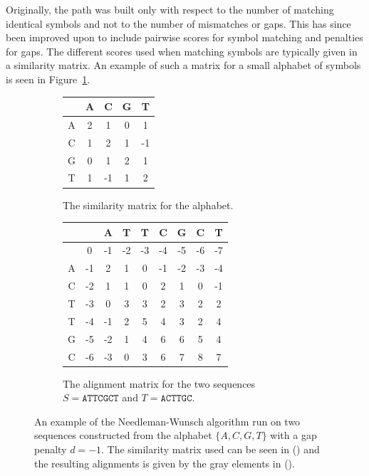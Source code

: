 \documentclass[a4paper]{report}
\begin{document}
Originally, the path was built only with respect to the number of matching
identical symbols and not to the number of mismatches or gaps. This has since
been improved upon to include pairwise scores for symbol matching and penalties
for gaps. The different scores used when matching symbols are typically given in
a similarity matrix. An example of such a matrix for a small alphabet of
symbols is seen in Figure~\ref{fig:simmatrix}.

\begin{figure}[t]
    \centering
    \begin{subfigure}[b]{0.3\textwidth}
        \begin{tabular}{| c | c | c | c | c |}
            \hline
              &  A &  C & G &  T \\ \hline
            A &  2 &  1 & 0 &  1 \\ \hline
            C &  1 &  2 & 1 & -1 \\ \hline
            G &  0 &  1 & 2 &  1 \\ \hline
            T &  1 & -1 & 1 &  2 \\ \hline
        \end{tabular}
        \caption{The similarity matrix for the alphabet.}
        \label{fig:simmatrix}
    \end{subfigure}
    \quad
    \begin{subfigure}[b]{0.55\textwidth}
        \begin{tabular}{| c | c | c | c | c | c | c | c | c |}
            \hline
            & & A & T & T & C & G & C & T \\ \hline
            &\cellcolor[gray]{0.9}0 & -1 & -2 & -3 & -4 & -5 & -6 & -7 \\
            \hline
            A & -1 &\cellcolor[gray]{0.9}2 & 1 & 0 & -1 & -2 & -3 & -4 \\
            \hline
            C & -2 &\cellcolor[gray]{0.9}1 & 1 & 0 & 2 & 1 & 0 & -1 \\ \hline
            T & -3 & 0 &\cellcolor[gray]{0.9}3 & 3 & 2 & 3 & 2 & 2 \\ \hline
            T & -4 & -1 & 2 &\cellcolor[gray]{0.9}5 &\cellcolor[gray]{0.9}4 & 3
            & 2 & 4 \\ \hline
            G & -5 & -2 & 1 & 4 & 6 &\cellcolor[gray]{0.9}6 & 5 & 4 \\ \hline
            C & -6 & -3 & 0 & 3 & 6 & 7 &\cellcolor[gray]{0.9}8 &
            \cellcolor[gray]{0.9}7 \\ \hline
        \end{tabular}
        \caption{The alignment matrix for the two sequences
            $S = \texttt{ATTCGCT}$ and $T = \texttt{ACTTGC}$.}
        \label{fig:nwmatrix}
    \end{subfigure}
    \caption{An example of the Needleman-Wunsch algorithm run on two sequences
    constructed from the alphabet $\{A, C, G, T\}$ with a gap penalty $d = -1$.
    The similarity matrix used can be seen in () and the
    resulting alignments is given by the gray elements in
    ().}
    \label{fig:nwtables}
\end{figure}
\end{document}
